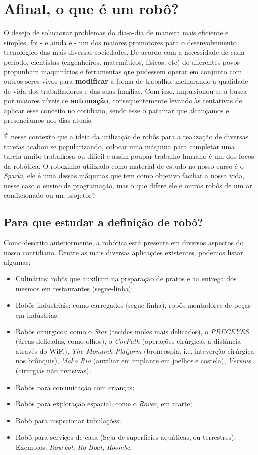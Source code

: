 \documentclass[conference]{IEEEtran}
\begin{document}
\section{\textbf{Afinal, o que é um robô?}}
    O desejo de solucionar problemas do dia-a-dia de maneira mais eficiente e simples, foi - e ainda é - um dos maiores promotores para o desenvolvimento tecnológico das mais diversas sociedades. De acordo com a necessidade de cada período, cientistas (engenheiros, matemáticos, físicos, etc) de diferentes povos propunham maquinários e ferramentas que pudessem operar em conjunto com outros seres vivos para \textbf{modificar} a forma de trabalho, melhorando a qualidade de vida dos trabalhadores e das suas famílias. Com isso, impulsionou-se a busca por maiores níveis de \textbf{automação}, consequentemente levando às tentativas de aplicar esse conceito no cotidiano, sendo esse o patamar que alcançamos e presenciamos nos dias atuais.
\par
    É nesse contexto que a ideia da utilização de robôs para a realização de diversas tarefas acabou se popularizando, colocar uma máquina para completar uma tarefa muito trabalhosa ou difícil e assim poupar trabalho humano é um dos focos da robótica. O robozinho utilizado como material de estudo no nosso curso é o \textit{Sparki}, ele é uma dessas máquinas que tem como objetivo faciliar a nossa vida, nesse caso o ensino de programação, mas o que difere ele e outros robôs de um ar condicionado ou um projetor?
\begin{center}
\subsection{Para que estudar a definição de robô?}    
\end{center}
\par
    Como descrito anteriormente, a robótica está presente em diversos aspectos do nosso contidiano. Dentre as mais diversas aplicações existentes, podemos listar algumas:
\begin{itemize}
    \item Culinárias: robôs que auxiliam na preparação de pratos e na entrega dos mesmos em restaurantes (segue-linha);
    \item Robôs industriais: como carregados (segue-linha), robôs montadores de peças em indústrias;
    \item Robôs cirurgicos: como o \textit{Star} (tecidos moles mais delicados), o \textit{PRECEYES} (áreas delicadas, como olhos), o \textit{CorPath} (operações cirúrgicas a distância através do WiFi), \textit{The Monarch Platform} (broncospia, i.e. inteverção cirúrgica nos brônquis), \textit{Mako Rio} (auxiliar em implante em joelhos e costela), \textit{Versius} (cirurgias não invasivas);
    \item Robôs para comunicação com crianças;
    \item Robôs para exploração espacial, como o \textit{Rover}, em marte;
    \item Robô para inspecionar tubulações;
    \item Robô para serviços de casa (Seja de superfícies aquáticas, ou terrestres). Exemplos: \textit{Row-bot}, \textit{Ro-Boat}, \textit{Roomba}.
\end{itemize}
\end{document}
